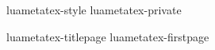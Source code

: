 

%
%


%





\environment luametatex-style
\environment luametatex-private

\startdocument
  [manual=LuaMeta\TeX,
   version=\cldcontext{status.luatex_verbose}]

\component luametatex-titlepage
\component luametatex-firstpage

